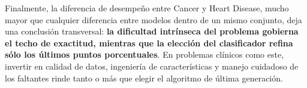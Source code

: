 Finalmente, la diferencia de desempeño entre Cancer y Heart Disease, mucho
mayor que cualquier diferencia entre modelos dentro de un mismo conjunto,
deja una conclusión transversal: \textbf{la dificultad intrínseca del
    problema gobierna el techo de exactitud, mientras que la elección del
    clasificador refina sólo los últimos puntos porcentuales}. En problemas
clínicos como este, invertir en calidad de datos, ingeniería de
características y manejo cuidadoso de los faltantes rinde tanto o más que
elegir el algoritmo de última generación.

\QED
